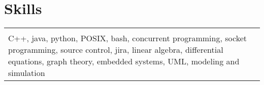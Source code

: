 \documentclass[10pt]{article}
\begin{document}
\section*{Skills}
\begin{tabular}{p{18.5cm}}
  \hline
  \multicolumn{1}{c}{} \\
  C++, java, python, POSIX, bash, concurrent programming, socket programming, source control, jira, linear algebra, differential equations, graph theory, embedded systems, UML, modeling and simulation
\end{tabular}
\end{document}
